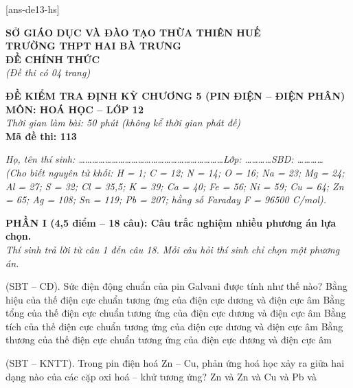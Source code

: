 \documentclass[11pt,a4paper]{article}
\def\loigiai#1{}
\begin{document}
[ans-de13-hs]

\noindent
\begin{minipage}[t]{0.48\textwidth}
	\textbf{SỞ GIÁO DỤC VÀ ĐÀO TẠO THỪA THIÊN HUẾ}\\
	\textbf{TRƯỜNG THPT HAI BÀ TRƯNG}\\
	\textbf{ĐỀ CHÍNH THỨC}\\
	\textit{(Đề thi có 04 trang)}
\end{minipage}\hfill
\begin{minipage}[t]{0.48\textwidth}
	\raggedleft
	\textbf{\color{mainGreen}ĐỀ KIỂM TRA ĐỊNH KỲ CHƯƠNG 5 (PIN ĐIỆN – ĐIỆN PHÂN)}\\
	\textbf{MÔN: HOÁ HỌC -- LỚP 12}\\
	\textit{Thời gian làm bài: 50 phút (không kể thời gian phát đề)}\\
	\textbf{Mã đề thi: 113}
\end{minipage}


\vspace{1pt}
\noindent\textit{Họ, tên thí sinh: \dots\dots\dots\dots\dots\dots\dots\dots\dots\dots\dots\dots\dots\dots\dots\dots\dots\dots\dots\dots\dots\dots Lớp: \dots\dots\dots\dots SBD: \dots\dots\dots\dots}\\
\noindent\textit{(Cho biết nguyên tử khối: H = 1; C = 12; N = 14; O = 16; Na = 23; Mg = 24; Al = 27; S = 32; Cl = 35,5; K = 39; Ca = 40; Fe = 56; Ni = 59; Cu = 64; Zn = 65; Ag = 108; Sn = 119; Pb = 207; hằng số Faraday F = 96500 C/mol).}

\vspace{2pt}
\noindent
\textbf{PHẦN I (4,5 điểm -- 18 câu): Câu trắc nghiệm nhiều phương án lựa chọn.}\\
\textit{Thí sinh trả lời từ câu 1 đến câu 18. Mỗi câu hỏi thí sinh chỉ chọn một phương án.}

\setcounter{ex}{0}

\begin{ex}
(SBT -- CĐ). Sức điện động chuẩn của pin Galvani được tính như thế nào?
\choice
{Bằng hiệu của thế điện cực chuẩn tương ứng của điện cực dương và điện cực âm}
{Bằng tổng của thế điện cực chuẩn tương ứng của điện cực dương và điện cực âm}
{Bằng tích của thế điện cực chuẩn tương ứng của điện cực dương và điện cực âm}
{Bằng thương của thế điện cực chuẩn tương ứng của điện cực dương và điện cực âm}
\loigiai{}
\end{ex}

\begin{ex}
(SBT -- KNTT). Trong pin điện hoá Zn -- Cu, phản ứng hoá học xảy ra giữa hai dạng nào của các cặp oxi hoá -- khử tương ứng?
\choice
{Zn và }
{Zn và Cu}
{ và }
{Pb và }
\loigiai{}
\end{ex}
\end{document}
